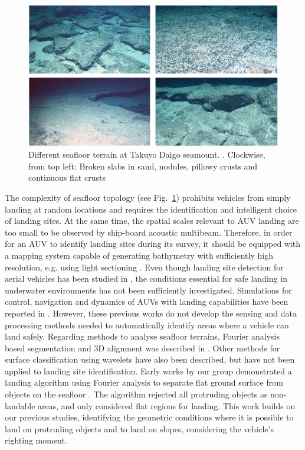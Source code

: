 \begin{figure}[!t]
\centering
\includegraphics[width=5.5in]{./images/mehul1.png}
\caption{Different seafloor terrain at Takuyo Daigo seamount\cite{Thornton2013l}. . Clockwise, from top left: Broken slabs in sand, nodules, pillowy crusts and continuous flat crusts}
\label{f:mehul1}
\end{figure}
The complexity of seafloor topology (see Fig.~\ref{f:mehul1}) prohibits vehicles from simply landing at random locations and requires the identification and intelligent choice of landing sites. At the same time, the spatial scales relevant to AUV landing are too small to be observed by ship-board acoustic multibeam. Therefore, in order for an AUV to identify landing sites during its survey, it should be equipped with a mapping system capable of generating bathymetry with sufficiently high resolution, e.g. using light sectioning \cite{Inglis2012,Nishida2016,Bodenmann2016}. Even though landing site detection for aerial vehicles has been studied in \cite{Desaraju2014, Sharp2001}, the conditions essential for safe landing in underwater environments has not been sufficiently investigated. Simulations for control, navigation and dynamics of AUVs with landing capabilities have been reported in \cite{Wang2007, Du2012}. However, these previous works do not develop the sensing and data processing methods needed to automatically identify areas where a vehicle can land safely. Regarding methods to analyse seafloor terrains, Fourier analysis based segmentation and 3D alignment was described in \cite{Douillard2012,Douillard2013}. Other methods for surface classification using wavelets \cite{Bhandari2007} have also been described, but have not been applied to landing site identification. Early works by our group demonstrated a landing algorithm using Fourier analysis to separate flat ground surface from objects on the seafloor \cite{Sangekar2010c}. The algorithm rejected all protruding objects as non-landable areas, and only considered flat regions for landing. This work builds on our previous studies, identifying the geometric conditions where it is possible to land on protruding objects and to land on slopes, considering the vehicle's righting moment. 


